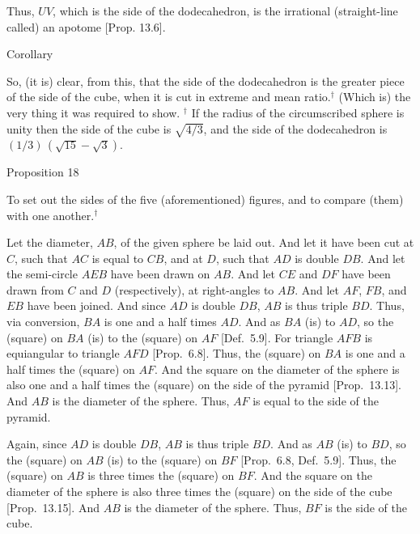 Thus, $UV$, which is the side of the dodecahedron, is the
irrational (straight-line called) an apotome [Prop. 13.6].



\begin{center}
{\large Corollary}
\end{center}

So, (it is) clear, from this, that the side of the dodecahedron
is the greater piece of the side of the cube, when it is cut in extreme
and mean ratio.$^\dag$ (Which is) the very thing it was required to show.
{\footnotesize\noindent$^\dag$ If the radius of the circumscribed sphere is
unity then the side of the cube is $\sqrt{4/3}$, and the side of the
dodecahedron is $(1/3)\,(\sqrt{15}-\sqrt{3})$.}


\begin{center}
{\large Proposition 18}
\end{center}

To set out the sides of the five (aforementioned) figures, and to compare (them)
with one another.$^\dag$

\epsfysize=2.25in
\centerline{}

Let the diameter, $AB$, of the given sphere be laid out. And let it
have been cut at $C$, such that $AC$ is equal to $CB$, and at $D$, such
that $AD$ is double $DB$. And let the semi-circle $AEB$ have been
drawn on $AB$. And let $CE$ and $DF$ have been drawn from $C$
and $D$ (respectively), at right-angles to $AB$. And let $AF$, $FB$,
and $EB$ have been joined. And since $AD$ is double $DB$, 
$AB$ is thus triple $BD$. Thus, via conversion, $BA$ is one and
a half times $AD$. And as $BA$ (is) to $AD$, so the (square)
on $BA$ (is) to the (square) on $AF$ [Def.~5.9].  For
triangle $AFB$ is equiangular to triangle $AFD$ [Prop.~6.8]. 
Thus, the (square) on $BA$ is one and a half times the (square)
on $AF$. And the square on the diameter of the sphere
is also one and a half times the (square) on the side of the pyramid
[Prop.~13.13].  And $AB$ is the diameter of the sphere. Thus,
$AF$ is equal to the side of the pyramid.

Again, since $AD$ is double $DB$,  $AB$ is thus triple $BD$. And
as $AB$ (is) to $BD$, so the (square) on $AB$ (is) to the (square)
on $BF$ [Prop.~6.8, Def.~5.9]. Thus, the (square) on $AB$
is three times the (square) on $BF$.  And the square on the diameter of
the sphere is also three times the (square) on the side of the cube [Prop.~13.15]. And $AB$ is the diameter of the sphere. Thus, $BF$ is the
side of the cube.

